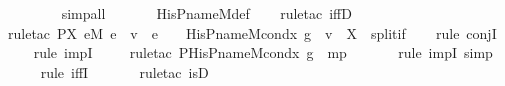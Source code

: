 \begin{isabellebody}
\ \ \ \ \ \ \isamarkupfalse%
\ simp{\isacharunderscore}{\kern0pt}all\ \ \ \isanewline
\ \ \isamarkupfalse%
\ His{\isacharunderscore}{\kern0pt}P{\isacharunderscore}{\kern0pt}name{\isacharunderscore}{\kern0pt}M{\isacharunderscore}{\kern0pt}def\ \isanewline
\ \ \isamarkupfalse%
{\isacharparenleft}{\kern0pt}rule{\isacharunderscore}{\kern0pt}tac\ iffD{}{\isacharparenright}{\kern0pt}\ \isanewline
\ \ \ \isamarkupfalse%
{\isacharparenleft}{\kern0pt}rule{\isacharunderscore}{\kern0pt}tac\ P{\isacharequal}{\kern0pt}{\isachardoublequoteopen}{\isasymlambda}X{\isachardot}{\kern0pt}\ {\isacharparenleft}{\kern0pt}{\isacharparenleft}{\kern0pt}{\isasymforall}e{\isasymin}M{\isachardot}{\kern0pt}\ e\ {\isasymin}\ v\ {\isasymlongleftrightarrow}\ e\ {\isacharequal}{\kern0pt}\ {}\ {\isasymand}\ His{\isacharunderscore}{\kern0pt}P{\isacharunderscore}{\kern0pt}name{\isacharunderscore}{\kern0pt}M{\isacharunderscore}{\kern0pt}cond{\isacharparenleft}{\kern0pt}x{\isacharprime}{\kern0pt}{\isacharcomma}{\kern0pt}\ g{\isacharparenright}{\kern0pt}{\isacharparenright}{\kern0pt}{\isacharparenright}{\kern0pt}\ {\isasymlongleftrightarrow}\ v\ {\isacharequal}{\kern0pt}\ X{\isachardoublequoteclose}\ \ split{\isacharunderscore}{\kern0pt}if{\isacharparenright}{\kern0pt}\ \isanewline
\ \ \isamarkupfalse%
{\isacharparenleft}{\kern0pt}rule\ conjI{\isacharparenright}{\kern0pt}\ \isanewline
\ \ \ \isamarkupfalse%
{\isacharparenleft}{\kern0pt}rule\ impI{\isacharparenright}{\kern0pt}\ \isanewline
\ \ \ \isamarkupfalse%
{\isacharparenleft}{\kern0pt}rule{\isacharunderscore}{\kern0pt}tac\ P{\isacharequal}{\kern0pt}{\isachardoublequoteopen}His{\isacharunderscore}{\kern0pt}P{\isacharunderscore}{\kern0pt}name{\isacharunderscore}{\kern0pt}M{\isacharunderscore}{\kern0pt}cond{\isacharparenleft}{\kern0pt}x{\isacharprime}{\kern0pt}{\isacharcomma}{\kern0pt}\ g{\isacharparenright}{\kern0pt}{\isachardoublequoteclose}\ \ mp{\isacharparenright}{\kern0pt}\ \isanewline
\ \ \ \ \isamarkupfalse%
\ {\isacharparenleft}{\kern0pt}rule\ impI{\isacharsemicolon}{\kern0pt}\ simp{\isacharparenright}{\kern0pt}\ \isanewline
\ \ \ \ \isamarkupfalse%
{\isacharparenleft}{\kern0pt}rule\ iffI{\isacharparenright}{\kern0pt}\ \isanewline
\ \ \ \ \ \isamarkupfalse%
{\isacharparenleft}{\kern0pt}rule{\isacharunderscore}{\kern0pt}tac\ is{\isacharunderscore}{\kern0pt}{}D{\isacharparenright}{\kern0pt}\ \isanewline

\end{isabellebody}
